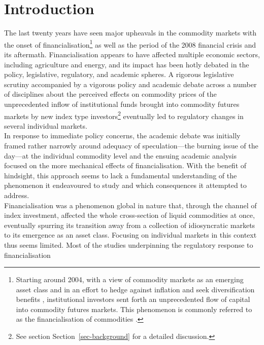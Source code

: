 \documentclass[
  authoryear,
  preprint,
  3p]{elsarticle}
\begin{document}
\newpage

\setlength{\parindent}{0pt}

\section{Introduction}\label{sec-introduction}

The last twenty years have seen major upheavals in the commodity markets
with the onset of financialisation\footnote{Starting around 2004, with a
  view of commodity markets as an emerging asset class and in an effort
  to hedge against inflation and seek diversification benefits
  \citep{buyuksahin_speculators_2014, singleton_investor_2013},
  institutional investors sent forth an unprecedented flow of capital
  into commodity futures markets. This phenomenon is commonly referred
  to as the financialisation of commodities
  \citep{domanski_financial_2007}.} as well as the period of the 2008
financial crisis and its aftermath. Financialisation appears to have
affected multiple economic sectors, including agriculture and energy,
and its impact has been hotly debated in the policy, legislative,
regulatory, and academic spheres. A rigorous legislative scrutiny
accompanied by a vigorous policy and academic debate across a number of
disciplines about the perceived effects on commodity prices of the
unprecedented inflow of institutional funds brought into commodity
futures markets by new index type investors\footnote{See section
  Section~\ref{sec-background} for a detailed discussion.} eventually
led to regulatory changes in several individual markets.\\
In response to immediate policy concerns, the academic debate was
initially framed rather narrowly around adequacy of speculation---the
burning issue of the day---at the individual commodity level and the
ensuing academic analysis focused on the more mechanical effects of
financialisation. With the benefit of hindsight, this approach seems to
lack a fundamental understanding of the phenomenon it endeavoured to
study and which consequences it attempted to address.\\
Financialisation was a phenomenon global in nature that, through the
channel of index investment, affected the whole cross-section of liquid
commodities at once, eventually spurring its transition away from a
collection of idiosyncratic markets to its emergence as an asset class.
Focusing on individual markets in this context thus seems limited. Most
of the studies underpinning the regulatory response to financialisation
\end{document}
